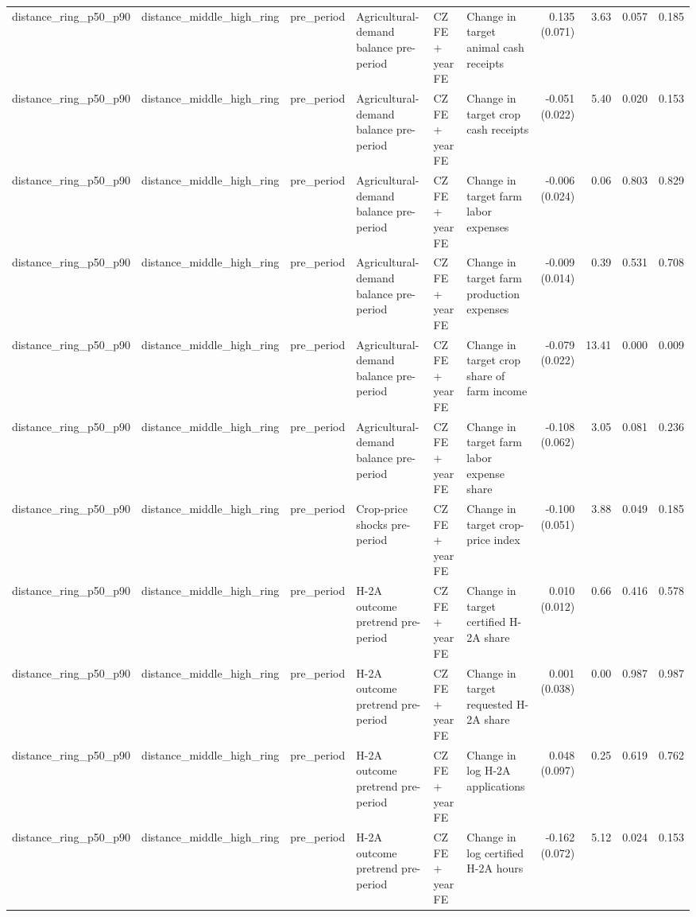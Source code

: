 \begin{tabular}{llllllrrrr}
distance_ring_p50_p90 & distance_middle_high_ring & pre_period & Agricultural-demand balance pre-period & CZ FE + year FE & Change in target animal cash receipts & 0.135 (0.071) & 3.63 & 0.057 & 0.185 \\
distance_ring_p50_p90 & distance_middle_high_ring & pre_period & Agricultural-demand balance pre-period & CZ FE + year FE & Change in target crop cash receipts & -0.051 (0.022) & 5.40 & 0.020 & 0.153 \\
distance_ring_p50_p90 & distance_middle_high_ring & pre_period & Agricultural-demand balance pre-period & CZ FE + year FE & Change in target farm labor expenses & -0.006 (0.024) & 0.06 & 0.803 & 0.829 \\
distance_ring_p50_p90 & distance_middle_high_ring & pre_period & Agricultural-demand balance pre-period & CZ FE + year FE & Change in target farm production expenses & -0.009 (0.014) & 0.39 & 0.531 & 0.708 \\
distance_ring_p50_p90 & distance_middle_high_ring & pre_period & Agricultural-demand balance pre-period & CZ FE + year FE & Change in target crop share of farm income & -0.079 (0.022) & 13.41 & 0.000 & 0.009 \\
distance_ring_p50_p90 & distance_middle_high_ring & pre_period & Agricultural-demand balance pre-period & CZ FE + year FE & Change in target farm labor expense share & -0.108 (0.062) & 3.05 & 0.081 & 0.236 \\
distance_ring_p50_p90 & distance_middle_high_ring & pre_period & Crop-price shocks pre-period & CZ FE + year FE & Change in target crop-price index & -0.100 (0.051) & 3.88 & 0.049 & 0.185 \\
distance_ring_p50_p90 & distance_middle_high_ring & pre_period & H-2A outcome pretrend pre-period & CZ FE + year FE & Change in target certified H-2A share & 0.010 (0.012) & 0.66 & 0.416 & 0.578 \\
distance_ring_p50_p90 & distance_middle_high_ring & pre_period & H-2A outcome pretrend pre-period & CZ FE + year FE & Change in target requested H-2A share & 0.001 (0.038) & 0.00 & 0.987 & 0.987 \\
distance_ring_p50_p90 & distance_middle_high_ring & pre_period & H-2A outcome pretrend pre-period & CZ FE + year FE & Change in log H-2A applications & 0.048 (0.097) & 0.25 & 0.619 & 0.762 \\
distance_ring_p50_p90 & distance_middle_high_ring & pre_period & H-2A outcome pretrend pre-period & CZ FE + year FE & Change in log certified H-2A hours & -0.162 (0.072) & 5.12 & 0.024 & 0.153 \\

\end{tabular}
